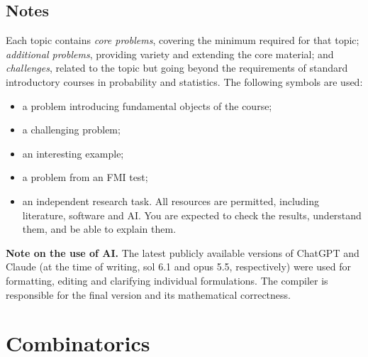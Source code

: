 \setcounter{tocdepth}{1}
\tableofcontents
\subsection*{Notes}
Each topic contains \emph{core problems}, covering the minimum required for that topic;
\emph{additional problems}, providing variety and extending the core material; and
\emph{challenges}, related to the topic but going beyond the requirements of standard
introductory courses in probability and statistics.
The following symbols are used:
\begin{itemize}
  \item[\faBook] a problem introducing fundamental objects of the course;
  \item[\faStar] a challenging problem;
  \item[\faSmile] an interesting example;
  \item[\faPencil*] a problem from an FMI test;
  \item[\faRobot] an independent research task. All resources are permitted, including
  literature, software and AI. You are expected to check the results, understand them,
  and be able to explain them.
\end{itemize}
{\small
\textbf{Note on the use of AI.}
The latest publicly available versions of ChatGPT and Claude (at the time of writing,
sol 6.1 and opus 5.5, respectively) were used for formatting, editing and clarifying
individual formulations. The compiler is responsible for the final version and its
mathematical correctness.
}
\section{Combinatorics}
